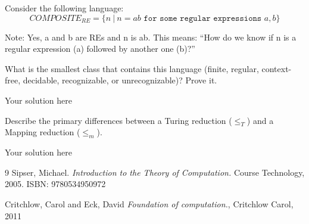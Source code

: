 \documentclass[12pt]{article}
\newenvironment{exercise}[2][Exercise]{\begin{trivlist}
\item[\hskip \labelsep {\bfseries #1}\hskip \labelsep {\bfseries #2.}]}{\end{trivlist}}
\newenvironment{solution}[1][{\color{red} Solution:}]{\begin{trivlist}
\item[\hskip \labelsep {\bfseries #1}\hskip \labelsep {\bfseries}]}{\end{trivlist}}
\begin{document}
\clearpage
\begin{exercise}{3}
Consider the following language:
\[COMPOSITE_{RE} = \{n \ | \ n = ab \texttt{ for some regular expressions } a,b\}\]

Note: Yes, a and b are REs and n is ab. This means: ``How do we know if n is a regular expression (a)  followed by another one (b)?''

What is the smallest class that contains this language (finite, regular, context-free, decidable, recognizable, or unrecognizable)? Prove it.
\end{exercise}

\begin{solution}
Your solution here
\end{solution}

\clearpage

\begin{exercise}{4}

Describe the primary differences between a Turing reduction ($\le_T$) and a Mapping reduction ($\le_m$).

\end{exercise}

\begin{solution}
Your solution here
\end{solution}


\vfill
\begin{thebibliography}{9}
Sipser, Michael. 
\textit{Introduction to the Theory of Computation.}
Course Technology, 2005. ISBN: 9780534950972

Critchlow, Carol and Eck, David
\textit{Foundation of computation.},
Critchlow Carol, 2011

\end{thebibliography}

 
\end{document}

